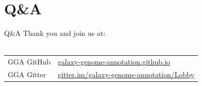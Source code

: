 \documentclass[12pt]{phage3slides} %
\begin{document}
\section{Q\&A}
\begin{frame}{Q\&A}
    Thank you and join us at:\\\ \\
    \begin{center}
        \begin{tabular}{ll}
            \color{gray} GGA GitHub & \href{https://galaxy-genome-annotation.github.io/}{galaxy-genome-annotation.github.io}\\
            \color{gray} GGA Gitter & \href{https://gitter.im/galaxy-genome-annotation/Lobby}{gitter.im/galaxy-genome-annotation/Lobby}\\
            \end{tabular}\\[1cm]
            \fundingNSFABIannotation
    \end{center}
\end{frame}
\end{document}
